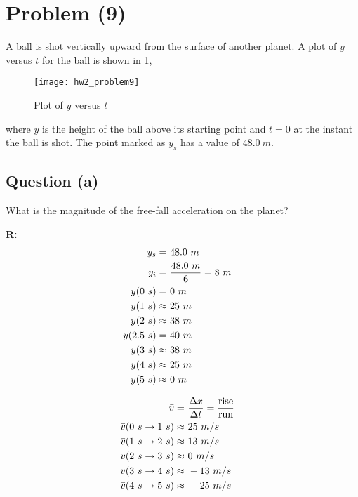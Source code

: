 \section{Problem (9)}
	A ball is shot vertically upward from the surface of another planet. A plot of $y$ versus $t$ for the ball is shown in \cref{fig:hw2_problem9},

	\begin{figure}[H]
		\begin{center}
			\texttt{[image: hw2\_problem9]}
			\caption{Plot of $y$ versus $t$}
			\label{fig:hw2_problem9}
		\end{center}
	\end{figure}

	where $y$ is the height of the ball above its starting point and $t = 0$ at the instant the ball is shot. The point marked as $y_{s}$ has a value of $48.0 \ m$.

	\subsection{Question (a)}
		What is the magnitude of the free-fall acceleration on the planet?

		\textbf{R:} \newline
		\begin{align}
			y_{s} = \ &48.0 \ m& \notag \\
			y_{i} = \ &\frac{48.0 \ m}{6} = 8 \ m& \notag \\
			y(0 \ s) = \ &0 \ m& \notag \\
			y(1 \ s) \approx \ &25 \ m& \notag \\
			y(2 \ s) \approx \ &38 \ m& \notag \\
			y(2.5 \ s) = \ &40 \ m& \notag \\
			y(3 \ s) \approx \ &38 \ m& \notag \\
			y(4 \ s) \approx \ &25 \ m& \notag \\
			y(5 \ s) \approx \ &0 \ m& \notag
		\end{align}

		\begin{align}
			\bar{v} = \ &\frac{\Delta x}{\Delta t} = \frac{\text{rise}}{\text{run}}& \notag \\
			\bar{v}(0 \ s \to 1 \ s) \approx \ &25 \ m/s& \notag \\
			\bar{v}(1 \ s \to 2 \ s) \approx \ &13 \ m/s& \notag \\
			\bar{v}(2 \ s \to 3 \ s) \approx \ &0 \ m/s& \notag \\
			\bar{v}(3 \ s \to 4 \ s) \approx \ &-13 \ m/s& \notag \\
			\bar{v}(4 \ s \to 5 \ s) \approx \ &-25 \ m/s& \notag
		\end{align}

